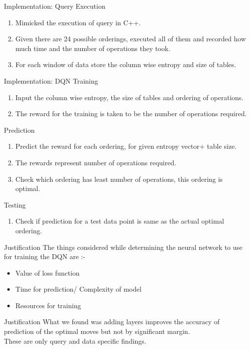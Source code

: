\begin{frame}{Implementation: Query Execution}
    \begin{enumerate}
        \item Mimicked the execution of query in C++.
        \item Given there are 24 possible orderings, executed all of them and recorded how much time and the number of operations they took.
        \item For each window of data store the column wise entropy and size of tables.
    \end{enumerate}
\end{frame}

\begin{frame}{Implementation: DQN}
    Training
    \begin{enumerate}
        \item Input the column wise entropy, the size of tables and ordering of operations.
        \item The reward for the training is taken to be the number of operations required.
    \end{enumerate}
    Prediction
    \begin{enumerate}
        \item Predict the reward for each ordering, for given entropy vector+ table size.\\
        \item The rewards represent number of operations required.
        \item Check which ordering has least number of operations, this ordering is optimal.
    \end{enumerate}
    Testing
    \begin{enumerate}
        \item Check if prediction for a test data point is same as the actual optimal ordering.
    \end{enumerate}
\end{frame}

\begin{frame}{Justification}
The things considered while determining the neural network to use for training the DQN are :-
    \begin{itemize}
        \item Value of loss function
        \item Time for prediction/ Complexity of model
        \item Resources for training
    \end{itemize}
\end{frame}

\begin{frame}{Justification}
    What we found was adding layers improves the accuracy of prediction of the optimal moves but not by significant margin.\\
    These are only query and data specific findings.
\end{frame}
